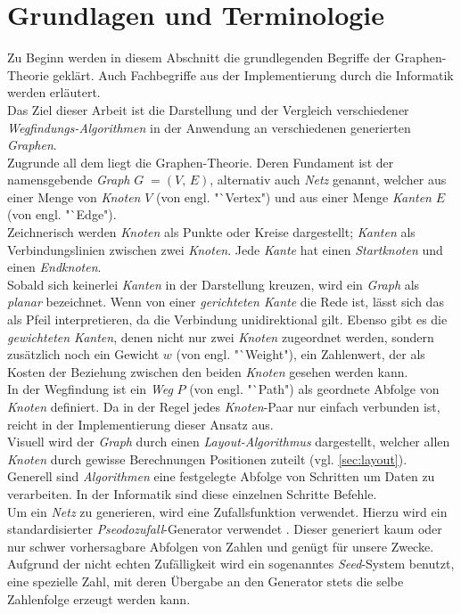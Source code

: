\documentclass[12pt]{article}
\begin{document}
\section{Grundlagen und Terminologie}
\label{sec:basics}
Zu Beginn werden in diesem Abschnitt die grundlegenden Begriffe der Graphen-Theorie geklärt. Auch Fachbegriffe aus der Implementierung durch die Informatik werden erläutert.
\\
Das Ziel dieser Arbeit ist die Darstellung und der Vergleich verschiedener \textit{Wegfindungs-Algorithmen} in der Anwendung an verschiedenen generierten \textit{Graphen}.
\\
Zugrunde all dem liegt die Graphen-Theorie. Deren Fundament ist der namensgebende \textit{Graph} $G\; = (V,\,E)$, alternativ auch \textit{Netz} genannt, welcher aus einer Menge von \textit{Knoten} $V$ 
(von engl. "`Vertex") und aus einer Menge \textit{Kanten} $E$ (von engl. "`Edge").
\\
Zeichnerisch werden \textit{Knoten} als Punkte oder Kreise dargestellt; \textit{Kanten} als Verbindungslinien zwischen zwei \textit{Knoten}. Jede \textit{Kante} hat einen \textit{Startknoten} und
einen \textit{Endknoten}. \\
Sobald sich keinerlei \textit{Kanten} in der Darstellung kreuzen, wird ein \textit{Graph} als \textit{planar} bezeichnet. Wenn von einer \textit{gerichteten Kante} die Rede ist, lässt sich das als Pfeil interpretieren, da die Verbindung unidirektional gilt. Ebenso gibt es die \textit{gewichteten Kanten}, 
denen nicht nur zwei \textit{Knoten} zugeordnet werden, sondern zusätzlich noch ein Gewicht $w$ (von engl. "`Weight"), ein Zahlenwert, der als Kosten der Beziehung zwischen den beiden \textit{Knoten} gesehen werden kann.
\\
In der Wegfindung ist ein \textit{Weg} $P$ (von engl. "`Path") als geordnete Abfolge von \textit{Knoten} definiert. Da in der Regel jedes \textit{Knoten}-Paar nur einfach verbunden ist, reicht in der Implementierung 
dieser Ansatz aus.
\\
Visuell wird der \textit{Graph} durch einen \textit{Layout-Algorithmus} dargestellt, welcher allen \textit{Knoten} durch gewisse Berechnungen Positionen zuteilt (vgl. \autoref{sec:layout}).
\\
Generell sind \textit{Algorithmen} eine festgelegte Abfolge von Schritten um Daten zu verarbeiten. In der Informatik sind diese einzelnen Schritte Befehle.
\\
Um ein \textit{Netz} zu generieren, wird eine Zufallsfunktion verwendet. Hierzu wird ein standardisierter \textit{Pseodozufall}-Generator verwendet \cite{random}. Dieser generiert kaum oder nur schwer vorhersagbare Abfolgen 
von Zahlen und genügt für unsere Zwecke. Aufgrund der nicht echten Zufälligkeit wird ein sogenanntes \textit{Seed}-System benutzt, eine spezielle Zahl, mit deren Übergabe an den Generator stets die selbe Zahlenfolge erzeugt
werden kann.
\newpage
\end{document}
